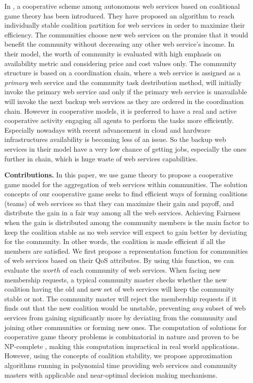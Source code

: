 \documentclass[10pt,journal,cspaper,compsoc]{IEEEtran}
\begin{document}
In \cite{10.1109/TSC.2012.12}, a cooperative scheme among autonomous
web services based on coalitional game theory has been introduced. They have proposed an algorithm to
reach individually stable coalition partition for web services in order to
maximize their efficiency. The communities choose new web services on the promise
that it would benefit the community without decreasing any other web service's
income. In their model, the worth of community is evaluated with high emphasis on
availability metric and considering price and cost values only. The community structure is based on a coordination chain,
where a web service is assigned as a \emph{primary} web service and the community task destribution
method, will initially invoke the primary web service and only if the primary web service is unavailable
will invoke the next backup web services as they are ordered in the coordination chain. However in cooperative models, it is preferred to
have a real and active cooperative activity engaging all agents to perform the tasks more efficiently. Especially nowadays
with recent advancement in cloud and hardware infrastructures availability is becoming less of an issue. So the backup web services
in their model have a very low chance of getting jobs, especially the ones further in chain, which is huge waste of web services
capabilities.

\textbf{Contributions.} In this paper, we use game theory to
propose a cooperative game model for the aggregation of web
services within communities. The solution concepts of our
cooperative game seeks to find efficient ways of forming
coalitions (teams) of web services so that they can maximize their
gain and payoff, and distribute the gain in a fair way among all
the web services. Achieving Fairness when the gain is distributed
among the community members is the main factor to keep the
coalition stable as no web service will expect to gain better by
deviating for the community. In other words, the coalition is made
efficient if all the members are satisfied. We first propose a
representation function for communities of web services based on
their QoS attributes. By using this function, we can evaluate the
$worth$ of each community of web services. When facing new
membership requests, a typical community master checks whether the
new coalition having the old and new set of web services will keep
the community stable or not. The community master will reject the
membership requests if it finds out that the new coalition would
be unstable, preventing $any$ subset of web services from gaining
significantly more by deviating from the community and joining
other communities or forming new ones. The computation of
solutions for cooperative game theory problems is combinatorial in
nature and proven to be NP-complete \cite{Algorithmic}, making
this computation impractical in real world applications. However,
using the concepts of coalition stability, we propose
approximation algorithms running in polynomial time providing web
services and community masters with applicable and near-optimal
decision making mechanisms.
\end{document}
